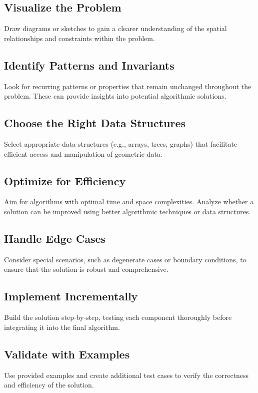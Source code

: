 \subsection{Visualize the Problem}
Draw diagrams or sketches to gain a clearer understanding of the spatial relationships and constraints within the problem.

\subsection{Identify Patterns and Invariants}
Look for recurring patterns or properties that remain unchanged throughout the problem. These can provide insights into potential algorithmic solutions.

\subsection{Choose the Right Data Structures}
Select appropriate data structures (e.g., arrays, trees, graphs) that facilitate efficient access and manipulation of geometric data.

\subsection{Optimize for Efficiency}
Aim for algorithms with optimal time and space complexities. Analyze whether a solution can be improved using better algorithmic techniques or data structures.

\subsection{Handle Edge Cases}
Consider special scenarios, such as degenerate cases or boundary conditions, to ensure that the solution is robust and comprehensive.

\subsection{Implement Incrementally}
Build the solution step-by-step, testing each component thoroughly before integrating it into the final algorithm.

\subsection{Validate with Examples}
Use provided examples and create additional test cases to verify the correctness and efficiency of the solution.

